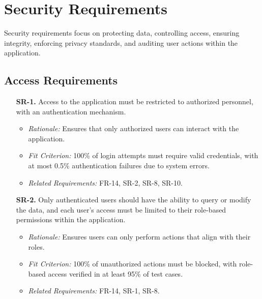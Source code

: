 \documentclass[12pt]{article}
\begin{document}
\section{Security Requirements}
Security requirements focus on protecting data, controlling access, ensuring 
integrity, enforcing privacy standards, and auditing user actions within the 
application.

\subsection{Access Requirements}
\begin{enumerate}
  \item[\textbf{SR-1.}] Access to the application must be restricted to 
  authorized personnel, with an authentication mechanism.
  \begin{itemize}
    \item \textit{Rationale:} Ensures that only authorized users can interact 
    with the application.
    \item \textit{Fit Criterion:} 100\% of login attempts must require valid 
    credentials, with at most 0.5\% authentication failures due to system errors.
    \item \textit{Related Requirements:} FR-14, SR-2, SR-8, SR-10.
  \end{itemize}

  \item[\textbf{SR-2.}] Only authenticated users should have the ability to 
  query or modify the data, and each user’s access must be limited to their 
  role-based permissions within the application.
  \begin{itemize}
    \item \textit{Rationale:} Ensures users can only perform actions that align 
    with their roles.
    \item \textit{Fit Criterion:} 100\% of unauthorized actions must be blocked, 
    with role-based access verified in at least 95\% of test cases.
    \item \textit{Related Requirements:} FR-14, SR-1, SR-8.
  \end{itemize}
\end{enumerate}
\end{document}
